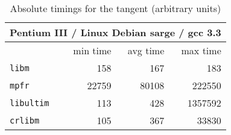 \begin{table}[!htb]
\begin{center}
\renewcommand{\arraystretch}{1.2}
\begin{tabular}{|l|r|r|r|}
\hline
 \multicolumn{4}{|c|}{Pentium III / Linux Debian sarge / gcc 3.3}   \\
 \hline
                        & min time       & avg time     & max time        \\
 \hline
 \texttt{libm}          & 158           &        167    & 183      \\
 \hline
 \texttt{mpfr}          & 22759         &      80108    & 222550      \\
 \hline
 \texttt{libultim}      & 113           &        428    & 1357592      \\
 \hline
 \texttt{crlibm}         & 105           &        367    & 33830      \\
 \hline
\end{tabular}
\end{center}
\caption{Absolute timings for the tangent (arbitrary units)
  \label{tbl:tan_abstime}}
\end{table}



